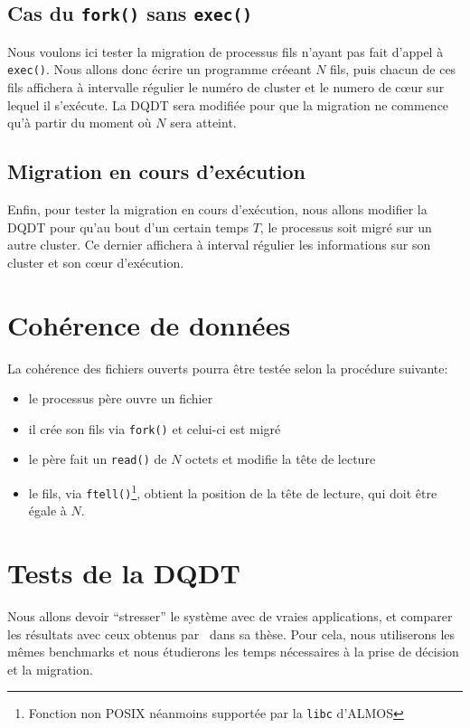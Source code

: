     \subsection{Cas du \texttt{fork()} sans \texttt{exec()}}

      Nous voulons ici tester la migration de processus fils n'ayant pas fait
      d'appel à \texttt{exec()}. Nous allons donc écrire un programme créeant
      $N$ fils, puis chacun de ces fils affichera à intervalle régulier le
      numéro de cluster et le numero de c\oe ur sur lequel il s'exécute. La DQDT
      sera modifiée pour que la migration ne commence qu'à partir du moment où
      $N$ sera atteint.

    \subsection{Migration en cours d'exécution}

      Enfin, pour tester la migration en cours d'exécution, nous allons modifier
      la DQDT pour qu'au bout d'un certain temps $T$, le processus soit migré
      sur un autre cluster. Ce dernier affichera à interval régulier les
      informations sur son cluster et son c\oe ur d'exécution.


  \section{Cohérence de données}

    La cohérence des fichiers ouverts pourra être testée selon la procédure
    suivante:
    \begin{itemize}
      \item le processus père ouvre un fichier
      \item il crée son fils via \texttt{fork()} et celui-ci est migré
      \item le père fait un \texttt{read()} de $N$ octets et modifie la tête de
        lecture
      \item le fils, via \texttt{ftell()}\footnote{Fonction non POSIX néanmoins
        supportée par la \texttt{libc} d'ALMOS}, obtient la position de la tête
        de lecture, qui doit être égale à $N$.
    \end{itemize}


  \section{Tests de la DQDT}
  \label{sec:dqdt-test}

    Nous allons devoir ``stresser'' le système avec de vraies applications, et
    comparer les résultats avec ceux obtenus
    par~\citeauthor{almaless2014universite} dans sa thèse. Pour cela, nous
    utiliserons les mêmes benchmarks et nous étudierons les temps nécessaires à
    la prise de décision et la migration.
